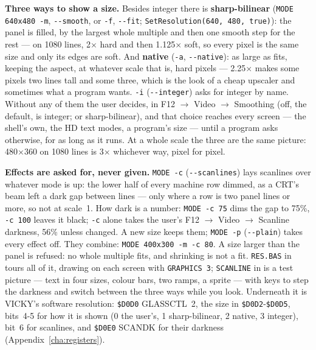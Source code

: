 \begin{sloppypar} %
\noindent \textbf{Three ways to show a size.} Besides integer there is
\textbf{sharp-bilinear} (\verb|MODE 640x480 -m|, \verb|--smooth|, or
\verb|-f|, \verb|--fit|; \texttt{SetResolution(640, 480, true)}): the
panel is filled, by the largest whole multiple and then one smooth step
for the rest --- on 1080 lines, 2$\times$ hard and then 1.125$\times$ soft, so
every pixel is the same size and only its edges are soft. And
\textbf{native} (\verb|-a|, \verb|--native|): as large as fits, keeping
the aspect, at whatever scale that is, hard pixels --- 2.25$\times$ makes
some pixels two lines tall and some three, which is the look of a cheap
upscaler and sometimes what a program wants. \verb|-i| (\verb|--integer|)
asks for integer by name. Without any of them the user decides, in
\textsc{F12} $\to$ Video $\to$ Smoothing (off, the default, is integer;
or sharp-bilinear), and that choice reaches every screen --- the shell's
own, the HD text modes, a program's size --- until a program asks
otherwise, for as long as it runs. At a whole scale the three are the
same picture: 480$\times$360 on 1080 lines is 3$\times$ whichever way,
pixel for pixel.

\noindent \textbf{Effects are asked for, never given.} \verb|MODE -c|
(\verb|--scanlines|) lays scanlines over whatever mode is up: the lower
half of every machine row dimmed, as a CRT's beam left a dark gap between
lines --- only where a row is two panel lines or more, so not at scale~1.
How dark is a number: \verb|MODE -c 75| dims the gap to 75\%,
\verb|-c 100| leaves it black; \verb|-c| alone takes the user's
\textsc{F12} $\to$ Video $\to$ Scanline darkness, 56\% unless changed.
A new size keeps them; \verb|MODE -p| (\verb|--plain|) takes every effect
off. They combine: \verb|MODE 400x300 -m -c 80|. A size larger than the
panel is refused: no whole multiple fits, and shrinking is not a fit.
\verb|RES.BAS| in  tours all of it, drawing on each
screen with \verb|GRAPHICS 3|; \verb|SCANLINE| in  is a
test picture --- text in four sizes, colour bars, two ramps, a sprite ---
with keys to step the darkness and switch between the three ways while
you look.
Underneath it is VICKY's software resolution: \texttt{\$D0D0} GLASSCTL~2,
the size in \texttt{\$D0D2}-\texttt{\$D0D5}, bits~4-5 for how it is shown
(0 the user's, 1 sharp-bilinear, 2 native, 3 integer), bit~6 for
scanlines, and \texttt{\$D0E0} SCANDK for their darkness
(Appendix~\ref{cha:registers}).
\end{sloppypar}

